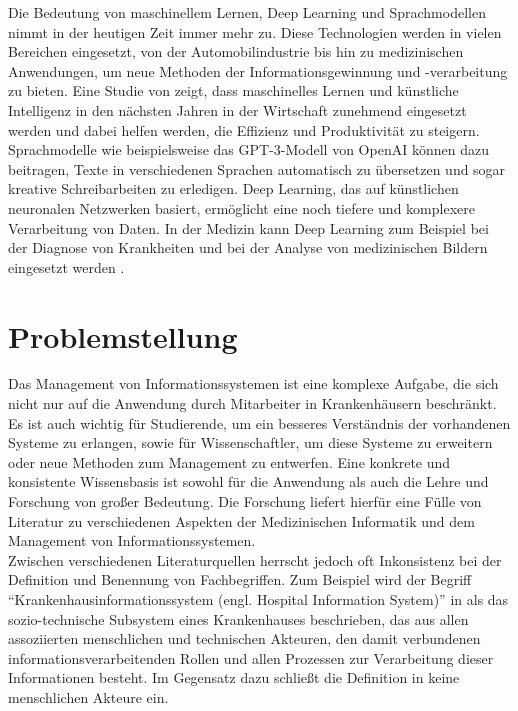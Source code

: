 Die Bedeutung von maschinellem Lernen, Deep Learning und Sprachmodellen nimmt in der heutigen Zeit immer mehr zu. Diese Technologien werden in vielen Bereichen eingesetzt, von der Automobilindustrie bis hin zu medizinischen Anwendungen, um neue Methoden der Informationsgewinnung und -verarbeitung zu bieten.%
Eine Studie von \citet{mckinsey} zeigt, dass maschinelles Lernen und künstliche Intelligenz in den nächsten Jahren in der Wirtschaft zunehmend eingesetzt werden und dabei helfen werden, die Effizienz und Produktivität zu steigern.
Sprachmodelle wie beispielsweise das GPT-3-Modell von OpenAI \citep{gpt3} können dazu beitragen, Texte in verschiedenen Sprachen automatisch zu übersetzen und sogar kreative Schreibarbeiten zu erledigen. 
Deep Learning, das auf künstlichen neuronalen Netzwerken basiert, ermöglicht eine noch tiefere und komplexere Verarbeitung von Daten. 
In der Medizin kann Deep Learning zum Beispiel bei der Diagnose von Krankheiten und bei der Analyse von medizinischen Bildern eingesetzt werden \citep{skincancer}.

\section{Problemstellung} \label{sec:problemstellung}
Das Management von Informationssystemen ist eine komplexe Aufgabe, die sich nicht nur auf die Anwendung durch Mitarbeiter in Krankenhäusern beschränkt. Es ist auch wichtig für Studierende, um ein besseres Verständnis der vorhandenen Systeme zu erlangen, sowie für Wissenschaftler, um diese Systeme zu erweitern oder neue Methoden zum Management zu entwerfen.
Eine konkrete und konsistente Wissensbasis ist sowohl für die Anwendung als auch die Lehre und Forschung von großer Bedeutung. Die Forschung liefert hierfür eine Fülle von Literatur zu verschiedenen Aspekten der Medizinischen Informatik und dem Management von Informationssystemen.\\

Zwischen verschiedenen Literaturquellen herrscht jedoch oft Inkonsistenz bei der Definition und Benennung von Fachbegriffen.
Zum Beispiel wird der Begriff \enquote{Krankenhausinformationssystem (engl. Hospital Information System)} in \citet{kis_winter} als das sozio-technische Subsystem eines Krankenhauses beschrieben,
das aus allen assoziierten menschlichen und technischen Akteuren, den damit verbundenen informationsverarbeitenden Rollen und allen Prozessen zur Verarbeitung dieser Informationen besteht.
Im Gegensatz dazu schließt die Definition in \citet{kis_italy} keine menschlichen Akteure ein.\\

